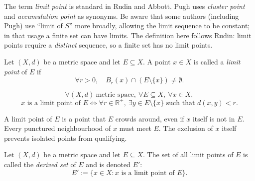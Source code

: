 \medskip
\begin{remark*}
The term \emph{limit point} is standard in Rudin and Abbott.
Pugh uses \emph{cluster point} and \emph{accumulation point} as synonyms.
Be aware that some authors (including Pugh) use ``limit of $S$'' more broadly,
allowing the limit sequence to be constant; in that usage a finite set can have
limits.
The definition here follows Rudin: limit points require a \emph{distinct}
sequence, so a finite set has no limit points.
\end{remark*}

\begin{tcolorbox}[colback=propbox, colframe=propborder, arc=2pt,
  left=6pt, right=6pt, top=4pt, bottom=4pt,
  title={\small\textbf{Definition (Limit Point)}},
  fonttitle=\small\bfseries]
\begin{definition}
\label{def:limit-point}
Let $(X,d)$ be a metric space and let $E \subseteq X$.
A point $x \in X$ is called a \emph{limit point} of $E$ if
\[
\forall r > 0,\quad B_r(x) \cap (E \setminus \{x\}) \neq \emptyset.
\]
\end{definition}
\end{tcolorbox}

\begin{remark*}
\[
\forall (X,d)\ \text{metric space},\
\forall E \subseteq X,\
\forall x \in X,
\]
\[
x \text{ is a limit point of } E
\iff
\forall r \in \mathbb{R}^+,\
\exists y \in E \setminus \{x\}
\text{ such that } d(x,y) < r.
\]
\end{remark*}



\begin{remark*}[Intuition]
A limit point of $E$ is a point that $E$ crowds around, even if $x$ itself
is not in $E$.
Every punctured neighbourhood of $x$ must meet $E$.
The exclusion of $x$ itself prevents isolated points from qualifying.
\end{remark*}

\begin{tcolorbox}[colback=propbox, colframe=propborder, arc=2pt,
  left=6pt, right=6pt, top=4pt, bottom=4pt,
  title={\small\textbf{Definition (Derived Set)}},
  fonttitle=\small\bfseries]
\begin{definition}[Derived Set]
\label{def:derived-set}
Let $(X,d)$ be a metric space and let $E \subseteq X$.
The set of all limit points of $E$ is called the \emph{derived set} of $E$
and is denoted $E'$:
\[
E' := \{x \in X : x \text{ is a limit point of } E \}.
\]
\end{definition}
\end{tcolorbox}

